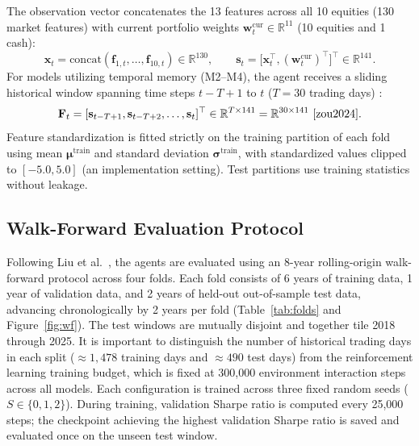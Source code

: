 \documentclass[11pt,a4paper]{article}
\numberwithin{equation}{section}
\numberwithin{table}{section}
\numberwithin{figure}{section}
\numberwithin{algorithm}{section}
\newcommand{\F}{\mathbf{F}}
\newcommand{\bs}{\mathbf{s}}
\newcommand{\bw}{\mathbf{w}}
\begin{document}
The observation vector concatenates the 13 features across all 10 equities (130 market features) with current portfolio weights $\bw_t^{\mathrm{cur}}\in\mathbb{R}^{11}$ (10 equities and 1 cash):
\begin{equation}
\mathbf{x}_t=\mathrm{concat}(\mathbf{f}_{1,t},\dots,\mathbf{f}_{10,t})\in\mathbb{R}^{130},\qquad \bs_t=\bigl[\mathbf{x}_t^\top,(\bw_t^{\mathrm{cur}})^\top\bigr]^\top\in\mathbb{R}^{141}.
\end{equation}
For models utilizing temporal memory (M2--M4), the agent receives a sliding historical window spanning time steps $t-T+1$ to $t$ ($T=30$ trading days) \cite{zou2024}:
\begin{equation}
\F_t=[\bs_{t-T+1},\bs_{t-T+2},\dots,\bs_t]^\top\in\mathbb{R}^{T\times141}=\mathbb{R}^{30\times141}\ \cite{zou2024}.
\end{equation}
Feature standardization is fitted strictly on the training partition of each fold using mean $\bm{\mu}^{\mathrm{train}}$ and standard deviation $\bm{\sigma}^{\mathrm{train}}$, with standardized values clipped to $[-5.0,5.0]$ (an implementation setting). Test partitions use training statistics without leakage.

\subsection{Walk-Forward Evaluation Protocol}
Following Liu et al.\ \cite{liu2024}, the agents are evaluated using an 8-year rolling-origin walk-forward protocol across four folds. Each fold consists of 6 years of training data, 1 year of validation data, and 2 years of held-out out-of-sample test data, advancing chronologically by 2 years per fold (Table~\ref{tab:folds} and Figure~\ref{fig:wf}). The test windows are mutually disjoint and together tile 2018 through 2025. It is important to distinguish the number of historical trading days in each split ($\approx1{,}478$ training days and $\approx490$ test days) from the reinforcement learning training budget, which is fixed at 300,000 environment interaction steps across all models. Each configuration is trained across three fixed random seeds ($S\in\{0,1,2\}$). During training, validation Sharpe ratio is computed every 25,000 steps; the checkpoint achieving the highest validation Sharpe ratio is saved and evaluated once on the unseen test window.
\end{document}
